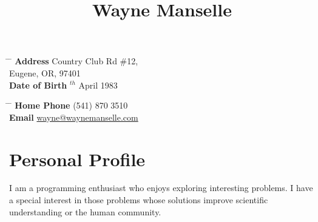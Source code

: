 \documentclass[10pt]{article} %
\begin{document}

\title{Wayne Manselle} %


\parbox{0.5\textwidth}{ %
\begin{tabbing} %
\hspace{3cm} \= \hspace{4cm} \= \kill %
{\bf Address}  Country Club Rd \#12,\\ %
\> Eugene, OR, 97401 \\ %
{\bf Date of Birth} $^{th}$ April 1983 \\ %
\end{tabbing}}
\hfill %
\parbox{0.5\textwidth}{ %
\begin{tabbing} %
\hspace{3cm} \= \hspace{4cm} \= \kill %
{\bf Home Phone} \> (541) 870 3510 \\ %
{\bf Email} \> \href{mailto:wayne@waynemanselle.com}{wayne@waynemanselle.com} \\ %
\end{tabbing}}


\section{Personal Profile}

I am a programming enthusiast who enjoys exploring interesting problems.  I have a special interest in those problems whose solutions improve scientific understanding or the human community.

\end{document}
